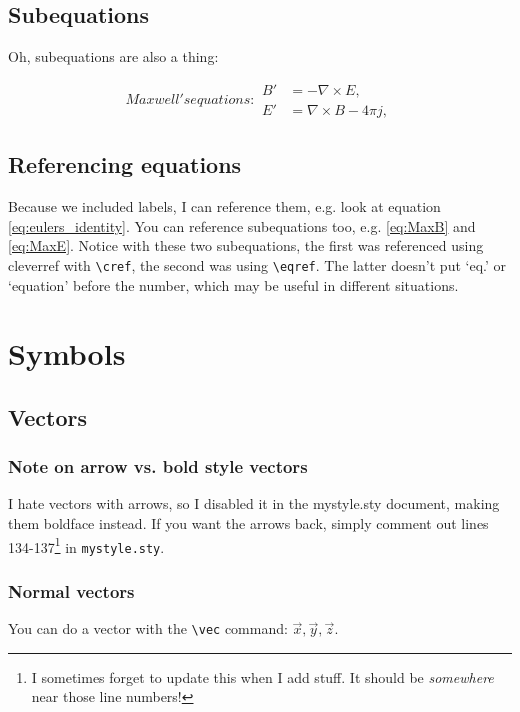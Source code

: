 \documentclass[../main]{subfiles}
\begin{document}
\subsection{Subequations}
Oh, subequations are also a thing:

\begin{subequations}
\label{eq:Maxwell}
Maxwell's equations:
\begin{align}
        B'&=-\nabla \times E,         \label{eq:MaxB} \\
        E'&=\nabla \times B - 4\pi j, \label{eq:MaxE}
\end{align}
\end{subequations}

\subsection{Referencing equations}
Because we included labels, I can reference them, e.g. look at equation \eqref{eq:eulers_identity}.
You can reference subequations too, e.g. \cref{eq:MaxB} and \eqref{eq:MaxE}. Notice with these two subequations, the first was referenced using cleverref with \verb|\cref|, the second was using \verb|\eqref|. The latter doesn't put `eq.' or `equation' before the number, which may be useful in different situations.

\section{Symbols}

\subsection{Vectors}

\subsubsection{Note on arrow vs. bold style vectors}
I hate vectors with arrows, so I disabled it in the mystyle.sty document, making them boldface instead. If you want the arrows back, simply comment out lines 134-137\footnote{I sometimes forget to update this when I add stuff. It should be \textit{somewhere} near those line numbers!} in \texttt{mystyle.sty}.

\subsubsection{Normal vectors}
You can do a vector with the \verb|\vec| command: $\vec{x}, \vec{y}, \vec{z}$. 
\end{document}
